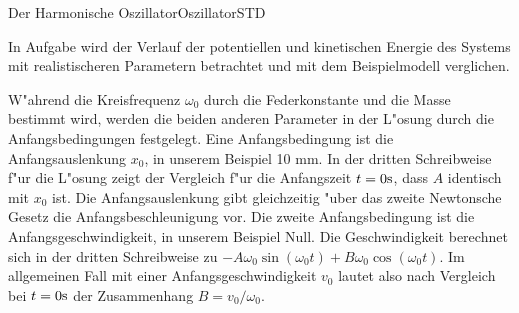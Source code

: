 \begin{MXContent}{Der Harmonische Oszillator}{Oszillator}{STD}
\begin{MExample}
\end{MExample}

In Aufgabe
wird der Verlauf der potentiellen und kinetischen Energie des Systems mit realistischeren Parametern betrachtet und mit dem Beispielmodell verglichen.


W"ahrend die Kreisfrequenz $\omega_0$ durch die Federkonstante und die Masse bestimmt wird, werden die beiden anderen Parameter in der L"osung durch die Anfangsbedingungen festgelegt. Eine Anfangsbedingung ist die Anfangsauslenkung $x_0$, in unserem Beispiel 10 mm. In der dritten Schreibweise f"ur die L"osung zeigt der Vergleich f"ur die Anfangszeit $t=0\mathrm{s}$, dass $A$ identisch mit $x_0$ ist. Die Anfangsauslenkung gibt gleichzeitig "uber das zweite Newtonsche Gesetz die Anfangsbeschleunigung vor. Die zweite Anfangsbedingung ist die Anfangsgeschwindigkeit, in unserem Beispiel Null. Die Geschwindigkeit berechnet sich in der dritten Schreibweise zu $-A \omega_0 \sin\left( \omega_0 t\right) + B \omega_0 \cos\left( \omega_0 t\right)$. Im allgemeinen Fall mit einer Anfangsgeschwindigkeit $v_0$ lautet also nach Vergleich bei $t=0\mathrm{s}$ der Zusammenhang $B=v_0/\omega_0$.

\end{MXContent}


